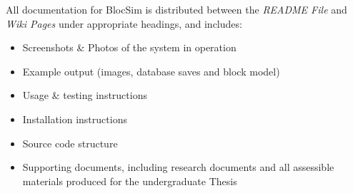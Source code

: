 All documentation for BlocSim is distributed between the \textit{README File} and \textit{Wiki Pages} under appropriate headings, and includes:
\begin{itemize}
\item Screenshots \& Photos of the system in operation
\item Example output (images, database saves and block model)
\item Usage \& testing instructions
\item Installation instructions
\item Source code structure
\item Supporting documents, including research documents and all assessible materials produced for the undergraduate Thesis
\end{itemize}






\begin{comment}

For more information regarding the ... of BlocSim, see the online materials outlined in Appendix \ref{ch:appendix}.

\begin{table}[ht]
	\center
	\begin{tabular}{$r^l^l} %
		\hline
		\rowstyle{\bfseries}
		H1 & H2 & H3 \\
		\hline
		Right & \gtick & \rcross \\
		A & B & C \\
		\hline
	\end{tabular}
	\caption{Dummy Table \cite{dummy:2012}}
	\label{tab:dummytable}
\end{table} 


\begin{itemize}
\item 
\end{itemize}


\end{comment}
